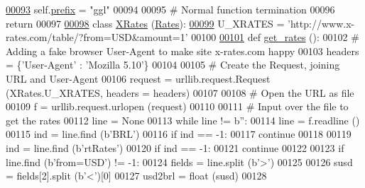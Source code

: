 \begin{DoxyCode}
{{\hypertarget{rates_8py_source.tex_l00093}{}\hyperlink{classrates_1_1_google_ada5de8700ad571d0ab819fa0163d6bbe}{00093}         self.\hyperlink{classrates_1_1_google_ada5de8700ad571d0ab819fa0163d6bbe}{prefix} = \textcolor{stringliteral}{"ggl"}
00094                 
00095         \textcolor{comment}{# Normal function termination}
00096         \textcolor{keywordflow}{return}
00097             
\hypertarget{rates_8py_source.tex_l00098}{}\hyperlink{classrates_1_1_x_rates}{00098} \textcolor{keyword}{class }\hyperlink{classrates_1_1_x_rates}{XRates} (\hyperlink{classrates_1_1_rates}{Rates}):
\hypertarget{rates_8py_source.tex_l00099}{}\hyperlink{classrates_1_1_x_rates_ab3bd64c08e6503f0d76c9f73dc38fa25}{00099}     U\_XRATES = \textcolor{stringliteral}{'http://www.x-rates.com/table/?from=USD&amount=1'}
00100 
\hypertarget{rates_8py_source.tex_l00101}{}\hyperlink{classrates_1_1_x_rates_a034e274f1bf0a2509af2621eb27c7cce}{00101}     \textcolor{keyword}{def }\hyperlink{classrates_1_1_x_rates_a034e274f1bf0a2509af2621eb27c7cce}{get\_rates} ():        
00102         \textcolor{comment}{# Adding a fake browser User-Agent to make site x-rates.com happy}
00103         headers = \{\textcolor{stringliteral}{'User-Agent'} : \textcolor{stringliteral}{'Mozilla 5.10'}\}
00104             
00105         \textcolor{comment}{# Create the Request, joining URL and User-Agent}
00106         request = urllib.request.Request (XRates.U\_XRATES, headers = headers)
00107     
00108         \textcolor{comment}{# Open the URL as file}
00109         f = urllib.request.urlopen (request)
00110         
00111         \textcolor{comment}{# Input over the file to get the rates}
00112         line = \textcolor{keywordtype}{None}
00113         \textcolor{keywordflow}{while} line != b\textcolor{stringliteral}{''}:
00114             line = f.readline ()
00115             ind = line.find (b\textcolor{stringliteral}{'BRL'})
00116             \textcolor{keywordflow}{if} ind == -1:
00117                 \textcolor{keywordflow}{continue} 
00118             
00119             ind = line.find (b\textcolor{stringliteral}{'rtRates'})
00120             \textcolor{keywordflow}{if} ind == -1:
00121                 \textcolor{keywordflow}{continue} 
00122                     
00123             \textcolor{keywordflow}{if} line.find (b\textcolor{stringliteral}{'from=USD'}) != -1:
00124                 fields = line.split (b\textcolor{stringliteral}{'>'})
00125                 
00126                 susd = fields[2].split (b\textcolor{stringliteral}{'<'})[0]
00127                 usd2brl = float (susd)
00128             
}}
\end{DoxyCode}
